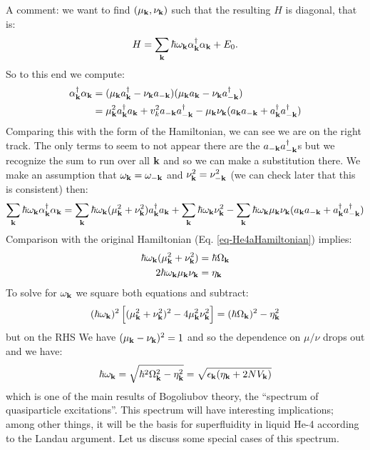 A comment: we want to find $(\mu_{\mathbf{k}}, \nu_{\mathbf{k}})$ such that the resulting $H$ is diagonal, that is:
\begin{equation}
    H = \sum_{\mathbf{k}}\hbar \omega_{\mathbf{k}}\alpha^\dagger_{\mathbf{k}}\alpha_{\mathbf{k}} + E_0.
\end{equation}
So to this end we compute:
\begin{equation}
    \begin{split}
        \alpha^\dagger_{\mathbf{k}}\alpha_{\mathbf{k}} &= (\mu_{\mathbf{k}}a^\dagger_{\mathbf{k}} - \nu_{\mathbf{k}}a_{-\mathbf{k}})(\mu_{\mathbf{k}}a_{\mathbf{k}} - \nu_{\mathbf{k}}a^\dagger_{-\mathbf{k}})
        \\ &= \mu_{\mathbf{k}}^2a^\dagger_{\mathbf{k}}a_{\mathbf{k}} + v_k^2a_{-\mathbf{k}}a^\dagger_{-\mathbf{k}} - \mu_{\mathbf{k}}\nu_{\mathbf{k}}(a_{\mathbf{k}}a_{-\mathbf{k}} + a^\dagger_{\mathbf{k}}a^\dagger_{-\mathbf{k}})
    \end{split}
\end{equation}
Comparing this with the form of the Hamiltonian, we can see we are on the right track. The only terms to seem to not appear there are the $a_{-\mathbf{k}}a^\dagger_{-\mathbf{k}}$s but we recognize the sum to run over all $\mathbf{k}$ and so we can make a substitution there. We make an assumption that $\omega_{\mathbf{k}} = \omega_{-\mathbf{k}}$ and $\nu_{\mathbf{k}}^2 = \nu_{-\mathbf{k}}^2$ (we can check later that this is consistent) then:
\begin{equation}
    \sum_{\mathbf{k}}\hbar \omega_{\mathbf{k}}\alpha^\dagger_{\mathbf{k}}\alpha_{\mathbf{k}} =  \sum_{\mathbf{k}}\hbar \omega_{\mathbf{k}}(\mu_{\mathbf{k}}^2 + \nu_{\mathbf{k}}^2)a^\dagger_{\mathbf{k}}a_{\mathbf{k}} + \sum_{\mathbf{k}}\hbar \omega_{\mathbf{k}}\nu_{\mathbf{k}}^2 - \sum_{\mathbf{k}}\hbar \omega_{\mathbf{k}}\mu_{\mathbf{k}}\nu_{\mathbf{k}}(a_{\mathbf{k}}a_{-\mathbf{k}} + a^\dagger_{\mathbf{k}}a^\dagger_{-\mathbf{k}})
\end{equation}
Comparison with the original Hamiltonian (Eq. \eqref{eq-He4aHamiltonian}) implies:
\begin{equation}
    \begin{split}
        \hbar \omega_{\mathbf{k}}(\mu_{\mathbf{k}}^2 + \nu_{\mathbf{k}}^2) &= \hbar \Omega_{\mathbf{k}}
    \\ 2\hbar \omega_{\mathbf{k}}\mu_{\mathbf{k}}\nu_{\mathbf{k}} &= \eta_{\mathbf{k}}
    \end{split}
\end{equation}
To solve for $\omega_{\mathbf{k}}$ we square both equations and subtract:
\begin{align*}
    (\hbar \omega_{\mathbf{k}})^2\left[(\mu_{\mathbf{k}}^2 + \nu_{\mathbf{k}}^2)^2 - 4\mu_{\mathbf{k}}^2\nu_{\mathbf{k}}^2\right] = (\hbar\Omega_{\mathbf{k}})^2 - \eta_{\mathbf{k}}^2
\end{align*}
but on the RHS We have $(\mu_{\mathbf{k}} - \nu_{\mathbf{k}})^2 = 1$ and so the dependence on $\mu/\nu$ drops out and we have:
\begin{equation}
    \hbar\omega_{\mathbf{k}} = \sqrt{\hbar^2\Omega_{\mathbf{k}}^2 - \eta_{\mathbf{k}}^2} = \sqrt{\epsilon_{\mathbf{k}}(\eta_{\mathbf{k}} + 2NV_{\mathbf{k}})}
\end{equation}
which is one of the main results of Bogoliubov theory, the ``spectrum of quasiparticle excitations''. This spectrum will have interesting implications; among other things, it will be the basis for superfluidity in liquid He-4 according to the Landau argument. Let us discuss some special cases of this spectrum. 

